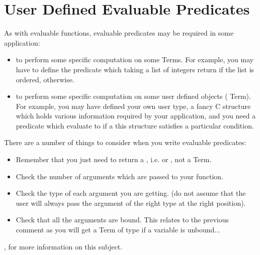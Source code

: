 \section{User Defined Evaluable Predicates}

As with evaluable functions, evaluable predicates may be required in some
application:

\begin{itemize}

\item to perform some specific computation on some Terms. For example,
you may have to define the  predicate which taking a list
of integers return  if the list is ordered, 
otherwise.

\item to perform some specific computation on some user defined objects
( Term). For example, you may have defined your own user type, a
fancy C structure which holds various information required by your
application, and you need a predicate which evaluate to  if a
this structure satisfies a particular condition.

\end{itemize}

There are a number of things to consider when you write evaluable
predicates:

\begin{itemize}

\item Remember that you just need to return a , i.e.
 or , not a Term.

\item Check the number of arguments which are passed to your function.

\item Check the type of each argument you are getting. (do not assume
that the user will always pass the argument of the right type at the
right position).

\item Check that all the arguments are bound. This relates to the previous
comment as you will get a Term of type  if a variable is
unbound...

\end{itemize}

, for more information
on this subject.

